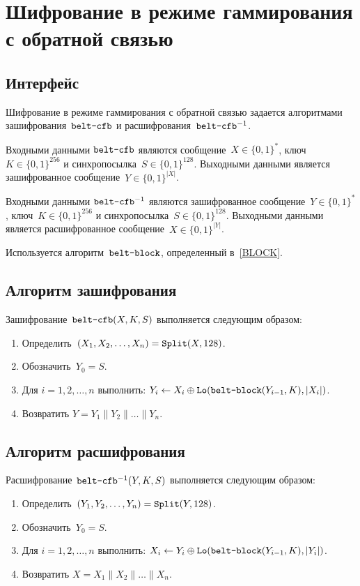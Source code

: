 \section{Шифрование в режиме гаммирования с обратной связью}\label{CFB}

\subsection{Интерфейс}\label{CFB.IFace}

Шифрование в режиме гаммирования с обратной связью задается алгоритмами 
зашифрования~$\texttt{belt-cfb}$ и расшифрования~$\texttt{belt-cfb}^{-1}$.

Входными данными $\texttt{belt-cfb}$ являются сообщение~$X\in\{0,1\}^*$, 
ключ~$K\in\{0,1\}^{256}$ и синхропосылка~$S\in\{0,1\}^{128}$.
%
Выходными данными является зашифрованное сообщение~$Y\in\{0,1\}^{|X|}$.

Входными данными $\texttt{belt-cfb}^{-1}$ являются зашифрованное 
сообщение~$Y\in\{0,1\}^*$, ключ~$K\in\{0,1\}^{256}$ и 
синхропосылка~$S\in\{0,1\}^{128}$. 
%
Выходными данными является расшифрованное сообщение~$X\in\{0,1\}^{|Y|}$.

Используется алгоритм~$\texttt{belt-block}$, определенный в~\ref{BLOCK}.

\subsection{Алгоритм зашифрования}\label{CFB.Encr}

Зашифрование~$\texttt{belt-cfb}(X,K,S)$ выполняется следующим образом: 
\begin{enumerate}
\item
Определить~$(X_1,X_2,\ldots,X_n)=\mathop{\texttt{Split}}\nolimits(X, 128)$.
\item
Обозначить~$Y_0=S$.
\item
Для $i=1,2,\ldots,n$ выполнить:
$Y_i\leftarrow X_i\oplus\mathop{\texttt{Lo}}\nolimits(\texttt{belt-block}(Y_{i-1},K), |X_i|)$.
\item
Возвратить
$Y=Y_1\parallel Y_2\parallel\ldots\parallel Y_n$.
\end{enumerate}

\subsection{Алгоритм расшифрования}\label{CFB.Decr}

Расшифрование~$\texttt{belt-cfb}^{-1}(Y,K,S)$ выполняется следующим образом: 
\begin{enumerate}
\item
Определить~$(Y_1,Y_2,\ldots,Y_n)=\mathop{\texttt{Split}}\nolimits(Y, 128)$.
\item
Обозначить~$Y_0=S$.
\item
Для $i=1,2,\ldots,n$ выполнить: 
$X_i\leftarrow Y_i\oplus\mathop{\texttt{Lo}}\nolimits(\texttt{belt-block}(Y_{i-1},K), |Y_i|)$.
\item
Возвратить
$X=X_1\parallel X_2\parallel\ldots\parallel X_n$.
\end{enumerate}
